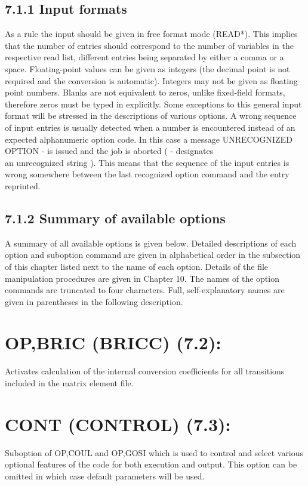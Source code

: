 \documentclass[10pt]{article}
\begin{document}
\subsection*{7.1.1 Input formats}
As a rule the input should be given in free format mode (READ*). This implies that the number of entries should correspond to the number of variables in the respective read list, different entries being separated by either a comma or a space. Floating-point values can be given as integers (the decimal point is not required and the conversion is automatic). Integers may not be given as floating point numbers. Blanks are not equivalent to zeros, unlike fixed-field formats, therefore zeros must be typed in explicitly. Some exceptions to this general input format will be stressed in the descriptions of various options. A wrong sequence of input entries is usually detected when a number is encountered instead of an expected alphanumeric option code. In this case a message UNRECOGNIZED OPTION - is issued and the job is aborted ( - designates\\
an unrecognized string ). This means that the sequence of the input entries is wrong somewhere between the last recognized option command and the entry reprinted.

\subsection*{7.1.2 Summary of available options}
A summary of all available options is given below. Detailed descriptions of each option and suboption command are given in alphabetical order in the subsection of this chapter listed next to the name of each option. Details of the file manipulation procedures are given in Chapter 10. The names of the option commands are truncated to four characters. Full, self-explanatory names are given in parentheses in the following description.

\section*{OP,BRIC (BRICC) (7.2):}
Activates calculation of the internal conversion coefficients for all transitions included in the matrix element file.

\section*{CONT (CONTROL) (7.3):}
Suboption of OP,COUL and OP,GOSI which is used to control and select various optional features of the code for both execution and output. This option can be omitted in which case default parameters will be used.
\end{document}
